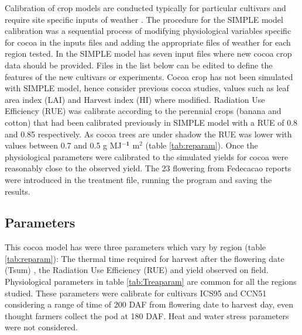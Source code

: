 \documentclass[gene,journal,article,submit,moreauthors,pdftex]{Definitions/mdpi}
\begin{document}
Calibration of crop models are conducted typically for particular cultivars and require site specific inputs of weather \citep{Crout20142}. The procedure for the SIMPLE model \citep{Zao2019simple} calibration  was a sequential process of modifying physiological variables specific for cocoa in the inputs files and  adding the appropriate files of weather for each region tested. In the SIMPLE model has seven input files where new cocoa crop data should be provided. Files in the list below can be edited to define the features of the new cultivars or experiments. Cocoa crop has not been simulated with SIMPLE model, hence consider previous cocoa studies, values such as leaf area index (LAI) \citep{Agele2016} and Harvest index (HI) \citep{Quintana2015} where modified. Radiation Use Efficiency (RUE) was calibrate according to the perennial crops  (banana and cotton) that had been calibrated previously in SIMPLE model \citep{Zao2019simple} with a RUE of 0.8 and 0.85 respectively. As cocoa trees are under shadow the RUE was lower with values between 0.7 and 0.5 g MJ$^{\mathbf{-1}}$ m$^{2}$ (table \ref{tab:reparam}).
Once the physiological parameters were calibrated to the  simulated yields for cocoa were reasonably close to the observed yield. The 23 flowering from Fedecacao reports were introduced in the treatment file, running the program and saving the results.  



\subsection{Parameters}

{\color{olive}This cocoa model has  were three parameters which vary by region (table \ref{tab:reparam}): The thermal time required for harvest after the flowering date (Tsum) , the Radiation Use Efficiency (RUE) and yield observed on field. Physiological parameters in table \ref{tab:Treaparam} are  common  for all the regions studied. These parameters were calibrate for cultivars ICS95 and CCN51 considering a range of time of 200 DAF from flowering date to harvest day, even thought farmers collect the pod at 180 DAF. Heat and water stress parameters were not considered. }
\end{document}
